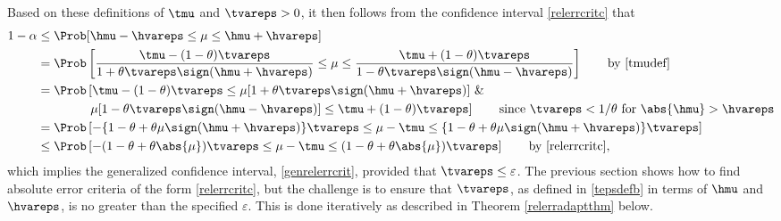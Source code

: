 \documentclass[graybox]{svmult}
\begin{document}
Based on these definitions of $\tmu$ and $\tvareps>0$, it then follows from the confidence interval \eqref{relerrcritc} that 
\begin{align}
\nonumber
1- \alpha & 
\le \Prob[\hmu-\hvareps \le \mu \le \hmu+\hvareps]\\
\nonumber
& = \Prob\left[ \frac{\tmu-(1-\theta)\tvareps}{1+\theta\tvareps\sign(\hmu+\hvareps)} \le \mu \le \frac{\tmu + (1-\theta) \tvareps}{1-\theta\tvareps\sign(\hmu-\hvareps)} \right] 
\qquad \text{by \eqref{tmudef}} \\
\nonumber
& = \Prob\left[ \tmu-(1-\theta)\tvareps \le \mu[1+\theta\tvareps\sign(\hmu+\hvareps)] \  \& \right. \\
\nonumber
& \qquad \qquad \left .  \mu[1-\theta\tvareps\sign(\hmu-\hvareps)] \le \tmu + (1-\theta) \tvareps \right] \qquad \text{since $\tvareps<1/\theta$ for $\abs{\hmu} > \hvareps$}\\
\nonumber
& = \Prob\left[ -\{1-\theta + \theta\mu\sign(\hmu+\hvareps)\} \tvareps \le \mu - \tmu \le  \{1-\theta + \theta\mu\sign(\hmu+\hvareps)\}\tvareps \right] \\
\nonumber
& \le \Prob\left[ -(1-\theta + \theta\abs{\mu}) \tvareps \le \mu - \tmu \le  (1-\theta + \theta\abs{\mu})\tvareps \right] \qquad \text{by \eqref{relerrcritc}},
\end{align}
which implies the generalized confidence interval, \eqref{genrelerrcrit}, provided that $\tvareps \le \varepsilon$.  The previous section shows how to find absolute error criteria of the form \eqref{relerrcritc}, but the challenge is to ensure that $\tvareps$, as defined in \eqref{tepsdefb} in terms of $\hmu$ and $\hvareps$, is no greater than the specified $\varepsilon$. This is done iteratively as described in Theorem \ref{relerradaptthm} below.
\end{document}
